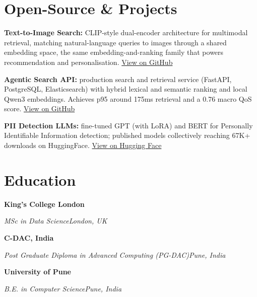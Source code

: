 \documentclass[10pt,a4paper]{article}
\newcommand{\entry}[4]{%
  {\color{company}\bfseries #1}\hfill {\color{muted}#2}\par
  \vspace{1pt}
  {\itshape #3}\hfill {\color{muted}\itshape #4}\par
  \vspace{3pt}%
}
\begin{document}
\section{Open-Source \& Projects}
\begin{tight}
  \item \textbf{Text-to-Image Search:} CLIP-style dual-encoder architecture for multimodal retrieval, matching natural-language queries to images through a shared embedding space, the same embedding-and-ranking family that powers recommendation and personalisation. \href{https://github.com/abhijeetscode/text-to-image-search}{View on GitHub}
  \item \textbf{Agentic Search API:} production search and retrieval service (FastAPI, PostgreSQL, Elasticsearch) with hybrid lexical and semantic ranking and local Qwen3 embeddings. Achieves p95 around 175ms retrieval and a 0.76 macro QoS score. \href{https://github.com/abhijeetscode/search-agent}{View on GitHub}
  \item \textbf{PII Detection LLMs:} fine-tuned GPT (with LoRA) and BERT for Personally Identifiable Information detection; published models collectively reaching 67K+ downloads on HuggingFace. \href{https://huggingface.co/ab-ai/pii_model}{View on Hugging Face}
\end{tight}

\section{Education}
\entry{King's College London}{}{MSc in Data Science}{London, UK}
\vspace{-3pt}
\entry{C-DAC, India}{}{Post Graduate Diploma in Advanced Computing (PG-DAC)}{Pune, India}
\vspace{-3pt}
\entry{University of Pune}{}{B.E. in Computer Science}{Pune, India}
\end{document}
